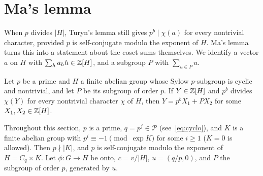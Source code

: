 
\section{Ma's lemma}\label{sec:ma}

When $p$ divides $|H|$, Turyn's lemma still gives $p^b \mid \chi(a)$ for every nontrivial
character, provided $p$ is self-conjugate modulo the exponent of $H$. Ma's lemma turns this into
a statement about the coset sums themselves. We identify a vector $a$ on $H$ with
$\sum_h a_h h \in \mathbb{Z}[H]$, and a subgroup $P$ with $\sum_{u \in P} u$.

\begin{lemma}\label{lem:ma}
Let $p$ be a prime and $H$ a finite abelian group whose Sylow $p$-subgroup is cyclic and
nontrivial, and let $P$ be its subgroup of order $p$. If $Y \in \mathbb{Z}[H]$ and $p^b$ divides $\chi(Y)$
for every nontrivial character $\chi$ of $H$, then $Y = p^b X_1 + P X_2$ for some
$X_1, X_2 \in \mathbb{Z}[H]$.
\end{lemma}

Throughout this section, $p$ is a prime, $q = p^j \in \mathcal{P}$ (see~\eqref{eq:cyclo}), and
$K$ is a finite abelian group with $p^i \equiv -1 \pmod{\exp K}$ for some $i \ge 1$ ($K = 0$ is
allowed). Then $p \nmid |K|$, and $p$ is self-conjugate modulo the exponent of
$H = C_q \times K$. Let $\phi \colon G \to H$ be onto, $c = v/|H|$, $u = (q/p, 0)$, and $P$ the
subgroup of order $p$, generated by $u$.

